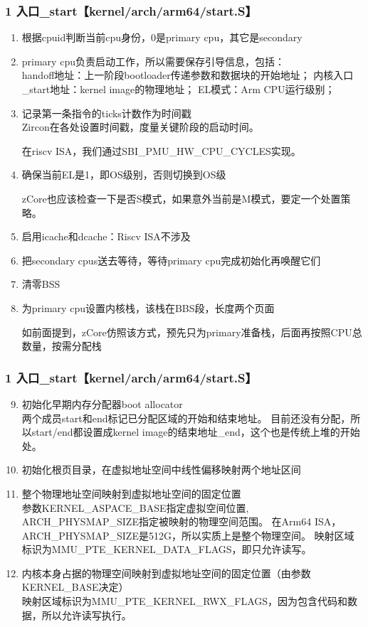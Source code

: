 \documentclass[
8pt, %
]{beamer}
\begin{document}
	\begin{frame}
		\frametitle{1 入口\_start【kernel/arch/arm64/start.S】}
		\begin{enumerate}
			\item 根据cpuid判断当前cpu身份，0是primary cpu，其它是secondary
			\item primary cpu负责启动工作，所以需要保存引导信息，包括：\\
			handoff地址：上一阶段bootloader传递参数和数据块的开始地址；
			内核入口\_start地址：kernel image的物理地址；
			EL模式：Arm CPU运行级别；
			\item 记录第一条指令的ticks计数作为时间戳\\
			Zircon在各处设置时间戳，度量关键阶段的启动时间。
			\begin{block}{}
				在riscv ISA，我们通过SBI\_PMU\_HW\_CPU\_CYCLES实现。
			\end{block}
			\item 确保当前EL是1，即OS级别，否则切换到OS级
			\begin{block}{}
				zCore也应该检查一下是否S模式，如果意外当前是M模式，要定一个处置策略。
			\end{block}
			\item 启用icache和dcache：Riscv ISA不涉及
			\item 把secondary cpus送去等待，等待primary cpu完成初始化再唤醒它们
			\item 清零BSS
			\item 为primary cpu设置内核栈，该栈在BBS段，长度两个页面
			\begin{block}{}
				如前面提到，zCore仿照该方式，预先只为primary准备栈，后面再按照CPU总数量，按需分配栈
			\end{block}
		\end{enumerate}
	\end{frame}

	\begin{frame}
		\frametitle{1 入口\_start【kernel/arch/arm64/start.S】}
		\begin{enumerate}\setcounter{enumi}{8}
			\item 初始化早期内存分配器boot allocator\\
			两个成员start和end标记已分配区域的开始和结束地址。
			目前还没有分配，所以start/end都设置成kernel image的结束地址\_end，这个也是传统上堆的开始处。
			\item 初始化根页目录，在虚拟地址空间中线性偏移映射两个地址区间
			\item 整个物理地址空间映射到虚拟地址空间的固定位置\\
			参数KERNEL\_ASPACE\_BASE指定虚拟空间位置, ARCH\_PHYSMAP\_SIZE指定被映射的物理空间范围。
            在Arm64 ISA，ARCH\_PHYSMAP\_SIZE是512G，所以实质上是整个物理空间。
			映射区域标识为MMU\_PTE\_KERNEL\_DATA\_FLAGS，即只允许读写。
			\item 内核本身占据的物理空间映射到虚拟地址空间的固定位置（由参数KERNEL\_BASE决定）\\
			映射区域标识为MMU\_PTE\_KERNEL\_RWX\_FLAGS，因为包含代码和数据，所以允许读写执行。
		\end{enumerate}
	\end{frame}
\end{document}
